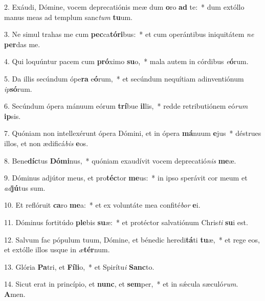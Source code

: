 2. Exáudi, Dómine, vocem deprecatiónis meæ dum \textbf{o}ro \textbf{ad} te:~*  dum extóllo manus meas ad templum sanc\textit{tum} \textbf{tu}um.\

3. Ne simul trahas me cum \textbf{pec}ca\textbf{tó}\textbf{ri}bus:~*  et cum operántibus iniquitátem \textit{ne} \textbf{per}das me.\

4. Qui loquúntur pacem cum \textbf{pró}ximo \textbf{su}o,~*  mala autem in córdibus \textit{e}\textbf{ó}rum.\

5. Da illis secúndum ópe\textbf{ra} e\textbf{ó}rum,~*  et secúndum nequítiam adinventiónum \textit{ip}\textbf{só}rum.\

6. Secúndum ópera mánuum eórum \textbf{trí}bue \textbf{il}lis,~*  redde retributiónem eó\textit{rum} \textbf{ip}sis.\

7. Quóniam non intellexérunt ópera Dómini, et in ópera \textbf{má}nuum \textbf{e}jus~*  déstrues illos, et non ædificá\textit{bis} \textbf{e}os.\

8. Bene\textbf{díc}tus \textbf{Dó}\textbf{mi}nus,~*  quóniam exaudívit vocem deprecatió\textit{nis} \textbf{me}æ.\

9. Dóminus adjútor meus, et pro\textbf{téc}tor \textbf{me}us:~*  in ipso sperávit cor meum et \textit{ad}\textbf{jú}tus sum.\

10. Et reflóruit \textbf{ca}ro \textbf{me}a:~*  et ex voluntáte mea confité\textit{bor} \textbf{e}i.\

11. Dóminus fortitúdo \textbf{ple}bis \textbf{su}æ:~*  et protéctor salvatiónum Chris\textit{ti} \textbf{su}i est.\

12. Salvum fac pópulum tuum, Dómine, et bénedic heredi\textbf{tá}ti \textbf{tu}æ,~*  et rege eos, et extólle illos usque in \textit{æ}\textbf{tér}num.\

13. Glória \textbf{Pa}tri, et \textbf{Fí}\textbf{li}o,~*  et Spirítu\textit{i} \textbf{Sanc}to.\

14. Sicut erat in princípio, et \textbf{nunc}, et \textbf{sem}per,~*  et in sǽcula sæculó\textit{rum}. \textbf{A}men.\

